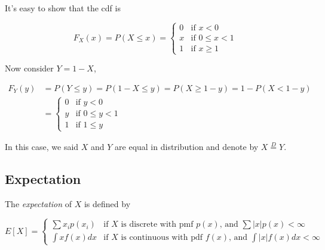 \documentclass{article}
\begin{document}
            It's easy to show that the cdf is

            \begin{equation*}
                F_{X}(x) = P ( X \leq x ) = \left\{
                     \begin{array}{ll}
                         0 & \text{if } x < 0 \\
                         x & \text{if } 0 \leq x < 1 \\
                         1 & \text{if } x \geq 1
                     \end{array}
                 \right.
            \end{equation*}

            Now consider $ Y = 1 - X $,

            \begin{align*}
                F_{Y}(y) &= P(Y \leq y) = P(1 -X \leq y) = P(X \geq 1 - y) = 1 - P(X < 1 - y) \\
                         &=  \left\{
                             \begin{array}{ll}
                                 0 & \text{if } y < 0        \\
                                 y & \text{if } 0 \leq y < 1 \\
                                 1 & \text{if } 1 \leq y
                             \end{array}
                         \right.
            \end{align*}

            In this case, we said $ X $ and $ Y $ are equal in distribution and
            denote by $ X \stackrel{D}{=} Y $.


        \subsection{Expectation}

            The \textit{expectation} of $ X $ is defined by

            \begin{equation}
                E[X]=\left\{
                    \begin{array}{ll}
                        \sum x_i p(x_{i}) & \text{if } X \text{ is discrete with pmf } p(x) \text{, and }
                            \sum |x| p(x) < \infty \\
                        \int x f(x) dx & \text{if } X \text{ is continuous with pdf } f(x) \text{, and }
                            \int |x| f(x) dx < \infty
                    \end{array}
                \right.
            \end{equation}
\end{document}
